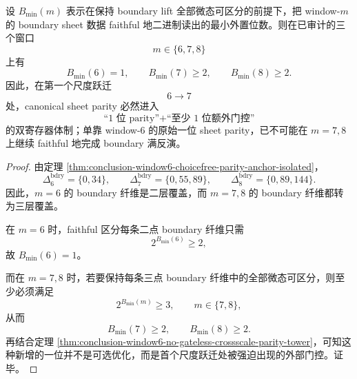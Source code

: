 \begin{theorem}[首个尺度跃迁的门控强迫]\label{thm:conclusion-window6-first-scale-jump-gate-forcing}
设 \(B_{\min}(m)\) 表示在保持 boundary lift 全部微态可区分的前提下，把 window-\(m\) 的 boundary sheet 数据 faithful 地二进制读出的最小外置位数。则在已审计的三个窗口
\[
m\in\{6,7,8\}
\]
上有
\[
B_{\min}(6)=1,
\qquad
B_{\min}(7)\ge 2,
\qquad
B_{\min}(8)\ge 2.
\]
因此，在第一个尺度跃迁
\[
6\to 7
\]
处，canonical sheet parity 必然进入
\[
\text{“1 位 parity”}+\text{“至少 1 位额外门控”}
\]
的双寄存器体制；单靠 window-\(6\) 的原始一位 sheet parity，已不可能在 \(m=7,8\) 上继续 faithful 地完成 boundary 满反演。
\end{theorem}
\begin{proof}
由定理 \ref{thm:conclusion-window6-choicefree-parity-anchor-isolated}，
\[
\Delta_6^{\mathrm{bdry}}=\{0,34\},
\qquad
\Delta_7^{\mathrm{bdry}}=\{0,55,89\},
\qquad
\Delta_8^{\mathrm{bdry}}=\{0,89,144\}.
\]
因此，\(m=6\) 的 boundary 纤维是二层覆盖，而 \(m=7,8\) 的 boundary 纤维都转为三层覆盖。

在 \(m=6\) 时，faithful 区分每条二点 boundary 纤维只需
\[
2^{B_{\min}(6)}\ge 2,
\]
故 \(B_{\min}(6)=1\)。

而在 \(m=7,8\) 时，若要保持每条三点 boundary 纤维中的全部微态可区分，则至少必须满足
\[
2^{B_{\min}(m)}\ge 3,
\qquad m\in\{7,8\},
\]
从而
\[
B_{\min}(7)\ge 2,
\qquad
B_{\min}(8)\ge 2.
\]
再结合定理 \ref{thm:conclusion-window6-no-gateless-crossscale-parity-tower}，可知这种新增的一位并不是可选优化，而是首个尺度跃迁处被强迫出现的外部门控。证毕。
\end{proof}

